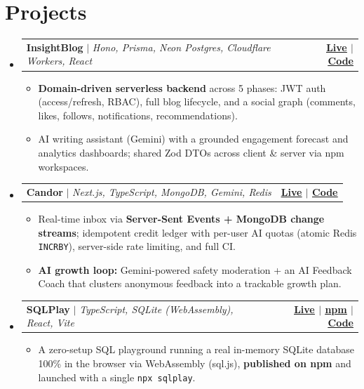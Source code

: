 \documentclass[letterpaper,11pt]{article}
\makeatletter
\newcommand{\resumeItem}[1]{
  \item\small{
    {#1 \vspace{-2pt}}
  }
}
\newcommand{\resumeProjectHeading}[2]{
    \item
    \begin{tabular*}{1.001\textwidth}{l@{\extracolsep{\fill}}r}
      \small#1 & \textbf{\small #2}\\
    \end{tabular*}\vspace{-7pt}
}
\newcommand{\resumeSubHeadingListStart}{\begin{itemize}[leftmargin=0.0in, label={}]}
\newcommand{\resumeSubHeadingListEnd}{\end{itemize}}
\newcommand{\resumeItemListStart}{\begin{itemize}}
\newcommand{\resumeItemListEnd}{\end{itemize}\vspace{-5pt}}
\makeatother
\begin{document}
\section{Projects}
    \vspace{-5pt}
    \resumeSubHeadingListStart
      \resumeProjectHeading
          {\textbf{InsightBlog} $|$ \emph{Hono, Prisma, Neon Postgres, Cloudflare Workers, React}}{\href{https://insightblog-one.vercel.app}{\underline{Live}} $|$ \href{https://github.com/Yogesh0627/Full_Stack_Project}{\underline{Code}}}
          \resumeItemListStart
            \resumeItem{\textbf{Domain-driven serverless backend} across 5 phases: JWT auth (access/refresh, RBAC), full blog lifecycle, and a social graph (comments, likes, follows, notifications, recommendations).}
            \resumeItem{AI writing assistant (Gemini) with a grounded engagement forecast and analytics dashboards; shared Zod DTOs across client \& server via npm workspaces.}
          \resumeItemListEnd
          \vspace{-13pt}
      \resumeProjectHeading
          {\textbf{Candor} $|$ \emph{Next.js, TypeScript, MongoDB, Gemini, Redis}}{\href{https://candor-cyan.vercel.app}{\underline{Live}} $|$ \href{https://github.com/Yogesh0627/anonymous-message-app}{\underline{Code}}}
          \resumeItemListStart
            \resumeItem{Real-time inbox via \textbf{Server-Sent Events + MongoDB change streams}; idempotent credit ledger with per-user AI quotas (atomic Redis \texttt{INCRBY}), server-side rate limiting, and full CI.}
            \resumeItem{\textbf{AI growth loop:} Gemini-powered safety moderation + an AI Feedback Coach that clusters anonymous feedback into a trackable growth plan.}
          \resumeItemListEnd
          \vspace{-13pt}
      \resumeProjectHeading
          {\textbf{SQLPlay} $|$ \emph{TypeScript, SQLite (WebAssembly), React, Vite}}{\href{https://sqlplay.vercel.app}{\underline{Live}} $|$ \href{https://www.npmjs.com/package/sqlplay}{\underline{npm}} $|$ \href{https://github.com/Yogesh0627/sqlplay}{\underline{Code}}}
          \resumeItemListStart
            \resumeItem{A zero-setup SQL playground running a real in-memory SQLite database 100\% in the browser via WebAssembly (sql.js), \textbf{published on npm} and launched with a single \texttt{npx sqlplay}.}
          \resumeItemListEnd
    \resumeSubHeadingListEnd
\vspace{-9pt}

\end{document}
